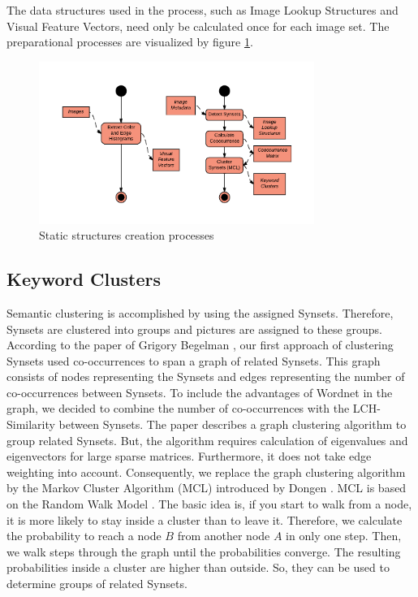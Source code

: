 The data structures used in the process, such as Image Lookup Structures and Visual Feature Vectors, need only be calculated once for each image set. The preparational processes are visualized by figure \ref{fig_precalcprocess}.

\begin{figure}[h]
\centering
\includegraphics[width=0.8\textwidth]{images/precalcs_activity_diagram.pdf}
\caption{Static structures creation processes}
\label{fig_precalcprocess}
\end{figure}


\subsection{Keyword Clusters}
\label{sec_keywordclustering}
Semantic clustering is accomplished by using the assigned Synsets. Therefore, Synsets are clustered into groups and pictures are assigned to these groups. According to the paper of Grigory Begelman \cite{begelman2006automated}, our first approach of clustering Synsets used co-occurrences to span a graph of related Synsets. This graph consists of nodes representing the Synsets and edges representing the number of co-occurrences between Synsets. To include the advantages of Wordnet in the graph, we decided to combine the number of co-occurrences with the LCH-Similarity between Synsets. The paper describes a graph clustering algorithm to group related Synsets. But, the algorithm requires calculation of eigenvalues and eigenvectors for large sparse matrices. Furthermore, it does not take edge weighting into account. Consequently, we replace the graph clustering algorithm by the Markov Cluster Algorithm (MCL) introduced by Dongen \cite{Dongen1998}. MCL is based on the Random Walk Model \cite{spitzer2001principles}. The basic idea is, if you start to walk from a node, it is more likely to stay inside a cluster than to leave it. Therefore, we calculate the probability to reach a node $B$ from another node $A$ in only one step. Then, we walk steps through the graph until the probabilities converge. The resulting probabilities inside a cluster are higher than outside. So, they can be used to determine groups of related Synsets.\\

